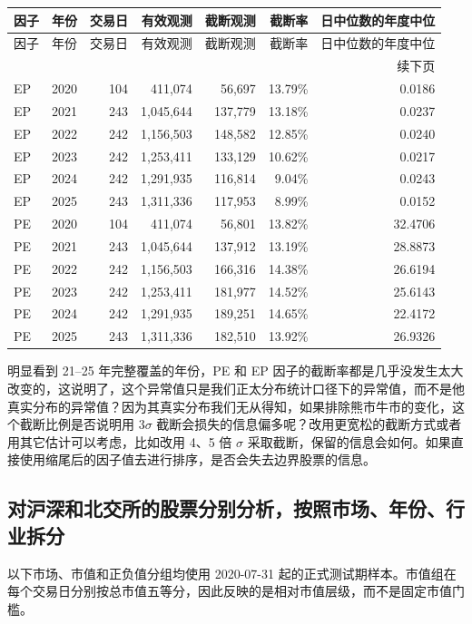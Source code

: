\documentclass[UTF8,11pt,a4paper,fontset=windows]{ctexart}
\begin{document}
\begin{longtable}{llrrrrr}
\toprule
因子 & 年份 & 交易日 & 有效观测 & 截断观测 & 截断率 & 日中位数的年度中位 \\
\midrule
\endfirsthead
\toprule
因子 & 年份 & 交易日 & 有效观测 & 截断观测 & 截断率 & 日中位数的年度中位 \\
\midrule
\endhead
\midrule
\multicolumn{7}{r}{续下页} \\
\endfoot
\bottomrule
\endlastfoot
EP & 2020 & 104 & 411,074   & 56,697  & 13.79\% & 0.0186 \\
EP & 2021 & 243 & 1,045,644 & 137,779 & 13.18\% & 0.0237 \\
EP & 2022 & 242 & 1,156,503 & 148,582 & 12.85\% & 0.0240 \\
EP & 2023 & 242 & 1,253,411 & 133,129 & 10.62\% & 0.0217 \\
EP & 2024 & 242 & 1,291,935 & 116,814 & 9.04\%  & 0.0243 \\
EP & 2025 & 243 & 1,311,336 & 117,953 & 8.99\%  & 0.0152 \\
PE & 2020 & 104 & 411,074   & 56,801  & 13.82\% & 32.4706 \\
PE & 2021 & 243 & 1,045,644 & 137,912 & 13.19\% & 28.8873 \\
PE & 2022 & 242 & 1,156,503 & 166,316 & 14.38\% & 26.6194 \\
PE & 2023 & 242 & 1,253,411 & 181,977 & 14.52\% & 25.6143 \\
PE & 2024 & 242 & 1,291,935 & 189,251 & 14.65\% & 22.4172 \\
PE & 2025 & 243 & 1,311,336 & 182,510 & 13.92\% & 26.9326 \\
\end{longtable}

明显看到 21--25 年完整覆盖的年份，PE 和 EP 因子的截断率都是几乎没发生太大改变的，这说明了，这个异常值只是我们正太分布统计口径下的异常值，而不是他真实分布的异常值？因为其真实分布我们无从得知，如果排除熊市牛市的变化，这个截断比例是否说明用 \(3\sigma\) 截断会损失的信息偏多呢？改用更宽松的截断方式或者用其它估计可以考虑，比如改用 4、5 倍 \(\sigma\) 采取截断，保留的信息会如何。如果直接使用缩尾后的因子值去进行排序，是否会失去边界股票的信息。

\subsection{对沪深和北交所的股票分别分析，按照市场、年份、行业拆分}

以下市场、市值和正负值分组均使用 2020-07-31 起的正式测试期样本。市值组在每个交易日分别按总市值五等分，因此反映的是相对市值层级，而不是固定市值门槛。
\end{document}
